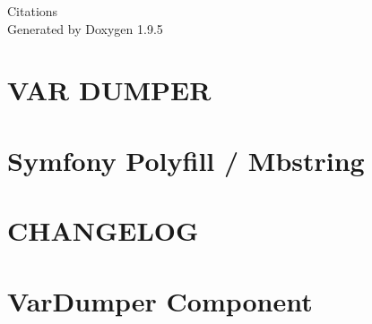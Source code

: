 \documentclass[twoside]{book}
\newcommand{\+}{\discretionary{\mbox{\scriptsize$\hookleftarrow$}}{}{}}
\newcommand{\clearemptydoublepage}{%
    \newpage{\pagestyle{empty}\cleardoublepage}%
  }
\begin{document}
  \raggedbottom
    \hypersetup{pageanchor=false,
                bookmarksnumbered=true,
                pdfencoding=unicode
               }
  \begin{titlepage}
  \vspace*{7cm}
  \begin{center}%
  {\Large Citations}\\
  \vspace*{1cm}
  {\large Generated by Doxygen 1.9.5}\\
  \end{center}
  \end{titlepage}
  \clearemptydoublepage
  \tableofcontents
  \clearemptydoublepage
  \hypersetup{pageanchor=true}
\chapter{VAR DUMPER}
\label{md__c__wamp64_www_citations_encours_src_vendor_rdehnhardt_var_dumper__r_e_a_d_m_e}

\chapter{Symfony Polyfill / Mbstring}
\label{md__c__wamp64_www_citations_encours_src_vendor_symfony_polyfill_mbstring__r_e_a_d_m_e}

\chapter{CHANGELOG}
\label{md__c__wamp64_www_citations_encours_src_vendor_symfony_var_dumper__c_h_a_n_g_e_l_o_g}

\chapter{Var\+Dumper Component}
\label{md__c__wamp64_www_citations_encours_src_vendor_symfony_var_dumper__r_e_a_d_m_e}

\end{document}
